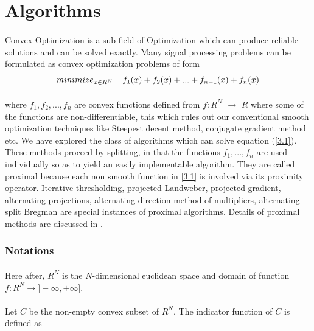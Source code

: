 \section{Algorithms}
\label{s:algorithms}

\paragraph{}Convex Optimization is a sub field of Optimization which can produce reliable solutions
and can be solved exactly. Many signal processing problems can be formulated as convex 
optimization problems of form
\begin{equation}
 minimize_{x \in R^N} \hspace{4mm}f_1(x) +f_2(x) + ... + f_{n-1}(x) +f_n(x)
\label{3.1}
\end{equation}

\paragraph{}where $f_1, f_2, ..., f_n$ are convex functions defined from $f:R^N$ $\rightarrow$ $R$ where some of the 
functions are non-differentiable, this which rules out our conventional smooth optimization
techniques like Steepest decent method, conjugate gradient method etc. We have explored
the class of algorithms which can solve equation (\ref{3.1}). These methods proceed by splitting, 
in that the functions $f_1, . . . , f_n$ are used individually so as to yield an easily
implementable algorithm. They are called proximal because each non smooth function in \ref{3.1} 
is involved via its proximity operator. Iterative thresholding, projected Landweber, projected
gradient, alternating projections, alternating-direction method of multipliers, alternating
split Bregman are special instances of proximal algorithms. Details of proximal methods are discussed in \cite{Com07}.

\subsubsection{Notations}
\paragraph{}Here after, $R^N$ is the $N$-dimensional euclidean space and domain of function 
$f: R^N  \rightarrow ]-\infty,+\infty]$. \\
\paragraph{}Let $C$ be the non-empty convex subset of $R^N$. The indicator function of $C$ is defined as

